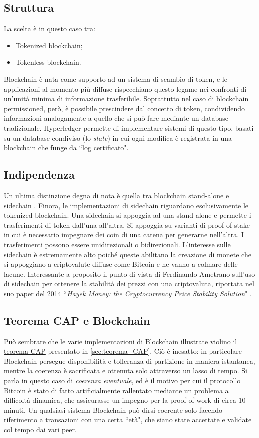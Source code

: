 	\subsection{Struttura}
		La scelta è in questo caso tra:
		\begin{itemize}
			\item Tokenized blockchain;
			\item Tokenless blockchain.
		\end{itemize}
		Blockchain è nata come supporto ad un sistema di scambio di token, e le applicazioni al momento più diffuse rispecchiano questo legame nei confronti di un'unità minima di informazione trasferibile. Soprattutto nel caso di blockchain permissioned, però, è possibile prescindere dal concetto di token, condividendo informazioni analogamente a quello che si può fare mediante un database tradizionale. Hyperledger permette di implementare sistemi di questo tipo, basati su un database condiviso (lo \emph{state}) in cui ogni modifica è registrata in una blockchain che funge da ``log certificato".
	
	\subsection{Indipendenza}
		Un ultima distinzione degna di nota è quella tra blockchain stand-alone e sidechain \cite{sidechain}. Finora, le implementazioni di sidechain riguardano esclusivamente le tokenized blockchain. Una sidechain si appoggia ad una stand-alone e permette i trasferimenti di token dall'una all'altra. Si appoggia su varianti di proof-of-stake in cui è necessario impegnare dei coin di una catena per generarne nell'altra. I trasferimenti possono essere unidirezionali o bidirezionali. L'interesse sulle sidechain è estremamente alto poiché queste abilitano la creazione di monete che si appoggiano a criptovalute diffuse come Bitcoin e ne vanno a colmare delle lacune. Interessante a proposito il punto di vista di Ferdinando Ametrano sull'uso di sidechain per ottenere la stabilità dei prezzi con una criptovaluta, riportata nel suo paper del 2014 ``\emph{Hayek Money: the Cryptocurrency Price Stability Solution}" \cite{hayek_money}.

	\subsection{Teorema CAP e Blockchain}
		Può sembrare che le varie implementazioni di Blockchain illustrate violino il \hyperref[sec:teorema_CAP]{teorema CAP} presentato in \ref{sec:teorema_CAP}. Ciò è inesatto: in particolare Blockchain persegue disponibilità e tolleranza di partizione in maniera istantanea, mentre la coerenza è sacrificata e ottenuta solo attraverso un lasso di tempo. Si parla in questo caso di \emph{coerenza eventuale}, ed è il motivo per cui il protocollo Bitcoin è stato di fatto artificialmente rallentato mediante un problema a difficoltà dinamica, che assicurasse un impegno per la proof-of-work di circa 10 minuti. Un qualsiasi sistema Blockchain può dirsi coerente solo facendo riferimento a transazioni con una certa ``età", che siano state accettate e validate col tempo dai vari peer.

